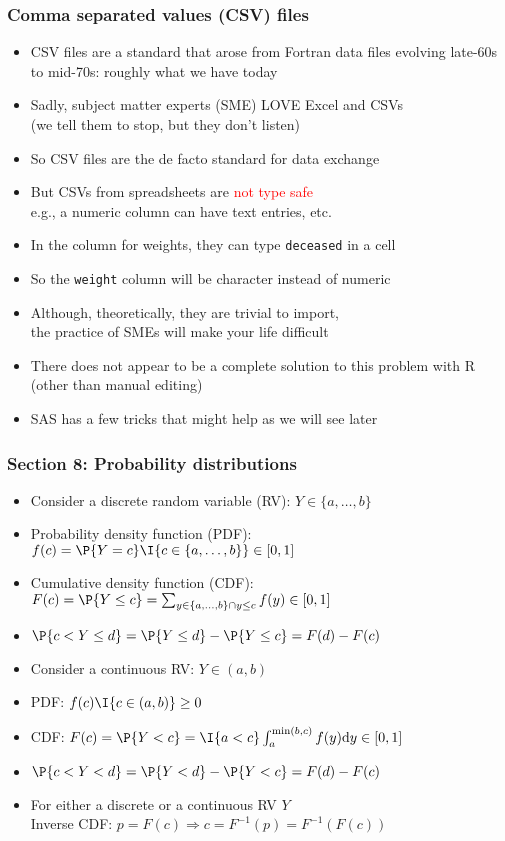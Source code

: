 \documentclass[11pt,pdftex,dvipsnames,usenames,helvetica]{beamer}
\begin{document}
\begin{frame}
\frametitle{Comma separated values (CSV) files}

\begin{itemize}
\item CSV files are a standard that arose from Fortran data files
evolving late-60s to mid-70s: roughly what we have today
\item Sadly, subject matter experts (SME) LOVE Excel and CSVs\\ 
(we tell them to stop, but they don't listen)
\item So CSV files are the de facto standard for data exchange
\item But CSVs from spreadsheets are \textcolor{red}{not type safe}\\
 e.g., a numeric column can have text entries, etc.
\item In the column for weights, they can type {\tt deceased} in a cell
\item So the {\tt weight} column will be character instead of numeric
\item Although, theoretically, they are trivial to import,\\
the practice of SMEs will make your life difficult
\item There does not appear to be a complete solution to this problem
with R (other than manual editing)
\item SAS has a few tricks that might help as we will see later
\end{itemize}

\end{frame}


\begin{frame}
\frametitle{Section 8: Probability distributions }

\begin{itemize}
\item Consider a discrete random variable (RV): $Y \in \{a, \ldots, b\} $
\item Probability density function (PDF):
  $f(c) = \P{Y=c}\I{c \in \{a, \ldots, b\}} \in [0, 1]$
\item Cumulative density function (CDF): $F(c) = \P{Y\le c}= 
\sum_{y \in \{a, \ldots, b\} \cap y\le c} f(y) \in [0, 1]$
\item $\P{c<Y \le d}=\P{Y \le d}-\P{Y \le c}=F(d)-F(c)$
\item Consider a continuous RV: $Y \in (a, b)$
\item PDF: $f(c)\I{c \in (a, b)} \ge 0 $
\item CDF: $F(c) = %
\P{Y < c}=
\I{a < c} \int_{a}^{\min(b,c)} f(y) \mathrm{d} y \in [0, 1]$
\item $\P{c<Y < d}=\P{Y < d}-\P{Y < c}=F(d)-F(c)$
\item For either a discrete or a continuous RV $Y$\\
Inverse CDF: $p=F(c) \Rightarrow c = F^{-1}(p) = F^{-1}(F(c))$
\end{itemize}

\end{frame} 
\end{document}
